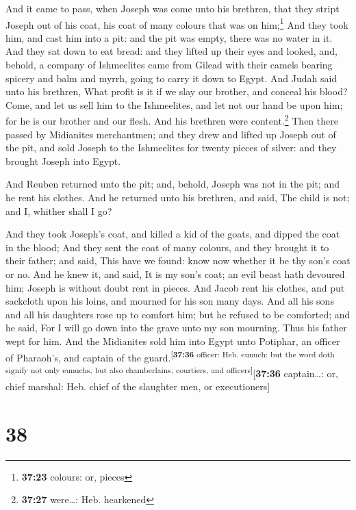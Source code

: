  And it came to pass, when Joseph was come unto his
brethren, that they stript Joseph out of his coat, his coat of many
colours that was on him;\footnote{\textbf{37:23} colours: or, pieces}
 And they took him, and cast him into a pit: and the pit
was empty, there was no water in it.  And they sat down
to eat bread: and they lifted up their eyes and looked, and, behold, a
company of Ishmeelites came from Gilead with their camels bearing
spicery and balm and myrrh, going to carry it down to Egypt.
 And Judah said unto his brethren, What profit is it if
we slay our brother, and conceal his blood?  Come, and
let us sell him to the Ishmeelites, and let not our hand be upon him;
for he is our brother and our flesh. And his brethren were
content.\footnote{\textbf{37:27} were\ldots: Heb. hearkened}
 Then there passed by Midianites merchantmen; and they
drew and lifted up Joseph out of the pit, and sold Joseph to the
Ishmeelites for twenty pieces of silver: and they brought Joseph into
Egypt.

 And Reuben returned unto the pit; and, behold, Joseph
was not in the pit; and he rent his clothes.  And he
returned unto his brethren, and said, The child is not; and I, whither
shall I go?

 And they took Joseph's coat, and killed a kid of the
goats, and dipped the coat in the blood;  And they sent
the coat of many colours, and they brought it to their father; and said,
This have we found: know now whether it be thy son's coat or no.
 And he knew it, and said, It is my son's coat; an evil
beast hath devoured him; Joseph is without doubt rent in pieces.
 And Jacob rent his clothes, and put sackcloth upon his
loins, and mourned for his son many days.  And all his
sons and all his daughters rose up to comfort him; but he refused to be
comforted; and he said, For I will go down into the grave unto my son
mourning. Thus his father wept for him.  And the
Midianites sold him into Egypt unto Potiphar, an officer of Pharaoh's,
and captain of the guard.\textsuperscript{{[}\textbf{37:36} officer:
Heb. eunuch: but the word doth signify not only eunuchs, but also
chamberlains, courtiers, and officers{]}}{[}\textbf{37:36}
captain\ldots: or, chief marshal: Heb. chief of the slaughter men, or
executioners{]}

\hypertarget{section-37}{%
\section{38}\label{section-37}}

